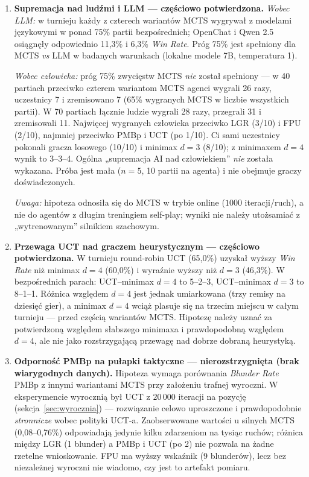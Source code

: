 \documentclass[11pt, a4paper]{article}
\begin{document}
\begin{enumerate}
    \item \textbf{Supremacja nad ludźmi i LLM --- częściowo potwierdzona.}
    \textit{Wobec LLM:} w turnieju każdy z czterech wariantów MCTS wygrywał z modelami językowymi w ponad 75\% partii bezpośrednich; OpenChat i Qwen 2.5 osiągnęły odpowiednio 11{,}3\% i 6{,}3\% \textit{Win Rate}. Próg 75\% jest spełniony dla MCTS \emph{vs} LLM w badanych warunkach (lokalne modele 7B, temperatura 1).

    \textit{Wobec człowieka:} próg 75\% zwycięstw MCTS \emph{nie} został spełniony --- w 40 partiach przeciwko czterem wariantom MCTS agenci wygrali 26 razy, uczestnicy 7 i zremisowano 7 (65\% wygranych MCTS w liczbie wszystkich partii). W 70 partiach łącznie ludzie wygrali 28 razy, przegrali 31 i zremisowali 11. Najwięcej wygranych człowieka przeciwko LGR (3/10) i FPU (2/10), najmniej przeciwko PMBp i UCT (po 1/10). Ci sami uczestnicy pokonali gracza losowego (10/10) i minimax $d{=}3$ (8/10); z minimaxem $d{=}4$ wynik to 3--3--4. Ogólna „supremacja AI nad człowiekiem” \emph{nie} została wykazana. Próba jest mała ($n{=}5$, 10 partii na agenta) i nie obejmuje graczy doświadczonych. 

    \textit{Uwaga:} hipoteza odnosiła się do MCTS w trybie online ($1000$ iteracji/ruch), a nie do agentów z długim treningiem self-play; wyniki nie należy utożsamiać z „wytrenowanym” silnikiem szachowym.

    \item \textbf{Przewaga UCT nad graczem heurystycznym --- częściowo potwierdzona.}
    W turnieju round-robin UCT (65{,}0\%) uzyskał wyższy \textit{Win Rate} niż minimax $d{=}4$ (60{,}0\%) i wyraźnie wyższy niż $d{=}3$ (46{,}3\%). W bezpośrednich parach: UCT--minimax $d{=}4$ to 5--2--3, UCT--minimax $d{=}3$ to 8--1--1. Różnica względem $d{=}4$ jest jednak umiarkowana (trzy remisy na dziesięć gier), a minimax $d{=}4$ wciąż plasuje się na trzecim miejscu w całym turnieju --- przed częścią wariantów MCTS. Hipotezę należy uznać za potwierdzoną względem słabszego minimaxa i prawdopodobną względem $d{=}4$, ale nie jako rozstrzygającą przewagę nad dobrze dobraną heurystyką.

    \item \textbf{Odporność PMBp na pułapki taktyczne --- nierozstrzygnięta (brak wiarygodnych danych).}
    Hipoteza wymaga porównania \textit{Blunder Rate} PMBp z innymi wariantami MCTS przy założeniu trafnej wyroczni. W eksperymencie wyrocznią był UCT z $20\,000$ iteracji na pozycję (sekcja~\ref{sec:wyrocznia}) --- rozwiązanie celowo uproszczone i prawdopodobnie \emph{stronnicze} wobec polityki UCT-a. Zaobserwowane wartości u silnych MCTS (0{,}08--0{,}76\%) odpowiadają jedynie kilku zdarzeniom na tysiąc ruchów; różnica między LGR (1 blunder) a PMBp i UCT (po 2) nie pozwala na żadne rzetelne wnioskowanie. FPU ma wyższy wskaźnik (9 blunderów), lecz bez niezależnej wyroczni nie wiadomo, czy jest to artefakt pomiaru.


\end{enumerate}
\end{document}
